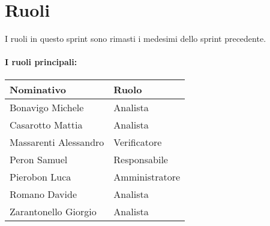 \section{Ruoli}

I ruoli in questo sprint sono rimasti i medesimi dello sprint precedente.

\paragraph{I ruoli principali:}

\begin{center}
    \begin{tabularx}{\textwidth}{X l}
        
        \rowcolor{gray!30} \textbf{Nominativo} & \textbf{Ruolo}\\
        
        \hline

        Bonavigo Michele & Analista \\
        \rowcolor{gray!10}Casarotto Mattia & Analista \\
        Massarenti Alessandro & Verificatore \\
        \rowcolor{gray!10}Peron Samuel & Responsabile \\
        Pierobon Luca & Amministratore \\
        \rowcolor{gray!10}Romano Davide & Analista \\
        Zarantonello Giorgio & Analista \\

    \end{tabularx}
\end{center}

